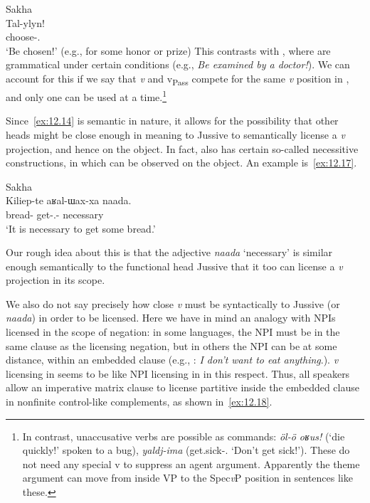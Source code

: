 \documentclass[output=paper]{langsci/langscibook}
\begin{document}
\ea\label{ex:12.16}Sakha\\
    \gll \llap{*}Tal-ylyn!\\
		choose-\Pass{}.\Imp{}\\
    \glt ‘Be chosen!’ (e.g., for some honor or prize)
\z
This contrasts with , where   are grammatical
under certain conditions (e.g., \emph{Be examined by a doctor!}). We can
account for this if we say that \emph{v}\textsubscript{\Imp} and
v\textsubscript{Pass} compete for the same \emph{v} position in ,
and only one can be used at a time.\footnote{In contrast,
    unaccusative verbs are possible as commands: \emph{öl-ö
    oʁus!} (‘die quickly!’ spoken to a bug), \emph{yaldj-ima}
    (get.sick-\Neg.\Imp{} ‘Don’t get sick!’). These do not need any special v
to suppress an agent argument. Apparently the theme argument can move from
inside VP to the Spec\emph{v}\textsubscript{\Imp}P position in sentences like
these.}

Since~\eqref{ex:12.14} is semantic in nature, it allows for the possibility
that other heads might be close enough in meaning to Jussive to semantically
license a \emph{v}\textsubscript{\Imp} projection, and hence  on the object. In fact,  also has certain so-called
necessitive constructions, in which  can be observed on the
object. An example is~\eqref{ex:12.17}.

\ea\label{ex:12.17}Sakha\\
    \gll Kiliep-te  aʁal-ɯax-xa  naada.\\
    bread-\Part{}  get-\Pros{}.\Ptcp{}-\Dat{}  necessary\\
    \glt ‘It is necessary to get some bread.’ \parencite[429]{StachowskiMenz1998}
\z

\begin{sloppypar}
\noindent Our rough idea about this is that the adjective \emph{naada} ‘necessary’ is
similar enough semantically to the functional head Jussive that it too can
license a \emph{v}\textsubscript{\Imp} projection in its scope.
\end{sloppypar}

We also do not say precisely how close \emph{v}\textsubscript{\Imp} must be
syntactically to Jussive (or \emph{naada}) in order to be licensed. Here we
have in mind an analogy with \glspl{NPI} licensed in the scope of negation: in
some languages, the \gls{NPI} must be in the same clause as the licensing
negation, but in others the \gls{NPI} can be at some distance, within an
embedded clause (e.g., : \emph{I don’t} \emph{want to eat
anything}.).  \emph{v}\textsubscript{\Imp} licensing in  seems to be
like NPI licensing in  in this respect. Thus, all speakers allow
an imperative matrix clause to license partitive inside the embedded clause in
nonfinite control-like complements, as shown in~\eqref{ex:12.18}.
\end{document}

